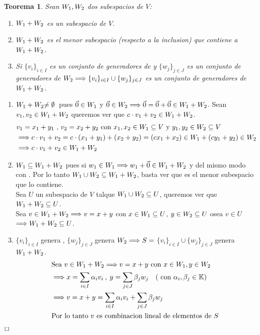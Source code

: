 \documentclass[]{article}
\newtheorem{theorem}{Teorema}
\newenvironment{proof}{\noindent{\bf Prueba:}}{$\hfill \Box$ \vspace{10pt}}
\newcommand{\K}{
    \mathbb{K}
}
\newcommand{\ida}{\Longrightarrow}
\begin{document}
\begin{theorem}
    Sean $\text{$W_{1}$} , \text{$W_{2}$}$ dos subespacios de $V$:
    \begin{enumerate}
        \item $\text{$W_{1}$} + \text{$W_{2}$}$ es un subespacio de $V$.
        \item $\text{$W_{1}$} + \text{$W_{2}$}$ es el menor subespacio (respecto a la inclusion) que contiene a $\text{$W_{1}$}+\text{$W_{2}$}$.
        \item Si $\{ v_i \}_{i \in I}$ es un conjunto de generadores de  y $\{ w_j \}_{j \in J}$ es un conjunto
        de generadores de $\W{2} \ida \{ v_i \}_{i \in I} \cup \{ w_j \}_{j \in J}$ es un conjunto de generadores de $\text{$W_{1}$}+\text{$W_{2}$}$.
    \end{enumerate}
\end{theorem}
\begin{proof}
    \begin{enumerate}
        \item $\text{$W_{1}$} + \text{$W_{2}$} \text{$\neq\emptyset$}\:$ pues $\text{$\vec{0}$} \in \text{$W_{1}$}$ y $\cero \in \W{2}\ida \cero=\cero+\cero \in \W{1}+\W{2}$.
        Sean $v_1,v_2 \in \text{$W_{1}$}+\text{$W_{2}$}$ queremos ver que $c \cdot v_1 + v_2 \in \text{$W_{1}$} + \text{$W_{2}$}$.
        \begin{align*}
            &v_1 = x_1 + y_1 \text{ , } v_2= x_2 + y_2 \text{ con } x_1,x_2 \in \W{1} \subseteq V
            \text{ y } y_1,y_2 \in \W{2} \subseteq V\\
            &\ida c \cdot v_1 + v_2 = c \cdot (x_1 + y_1) + (x_2 + y_2) = 
            (cx_1 + x_2) \in  \W{1} + (cy_1 + y_2) \in \W{2}\\
            &\ida c \cdot v_1 + v_2 \in \W{1} + \W{2}
        \end{align*}
        \item $\text{$W_{1}$} \subseteq \text{$W_{1}$} + \text{$W_{2}$}$ pues si $w_1 \in \W{1} \ida w_1 + \cero \in \W{1}+\W{2}$ y del mismo modo con .
        Por lo tanto $\text{$W_{1}$} \cup \text{$W_{2}$} \subseteq \text{$W_{1}$} + \text{$W_{2}$}$, basta ver que es el menor subespacio que lo contiene.\\
        Sea $U$ un subespacio de $V$ talque $\text{$W_{1}$} \cup \text{$W_{2}$} \subseteq U$, queremos ver que $\text{$W_{1}$} + \text{$W_{2}$} \subseteq U$.\\
        Sea $v \in \W{1} + \W{2} \ida v=x+y$ con $x \in \text{$W_{1}$} \subseteq U$, $y \in \text{$W_{2}$} \subseteq U$ osea $v \in U$
        $\ida \W{1} + \W{2} \subseteq U$.
        \item $\{v_i\}_{i \in I}$ genera , $\{w_j\}_{j \in J}$ genera $\W{2} \ida S=$
        $\{v_i\}_{i \in I} \cup \{w_j\}_{j \in J}$ genera $\text{$W_{1}$} + \text{$W_{2}$}$.
        \begin{align*}
            &\text{Sea } v \in \W{1} + \W{2} \ida v=x+y \text{ con } x \in \W{1} , y \in \W{2}\\
            &\ida x=\sum_{i \in I} \alpha_i v_i \: , \: y=\sum_{j \in J} \beta_j w_j
            \quad (\text{ con } \alpha_i,\beta_j \in \K)\\
            &\ida v=x+y=\sum_{i \in I}\alpha_i v_i + \sum_{j \in J}\beta_j w_j\\
            &\text{Por lo tanto $v$ es combinacion lineal de elementos de $S$}
        \end{align*}
    \end{enumerate}
\end{proof}
\end{document}
